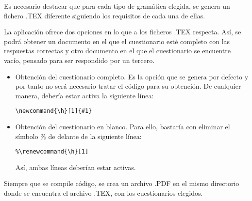 
Es necesario destacar que para cada tipo de gramática elegida, se genera un fichero .TEX diferente siguiendo los requisitos de cada una de ellas. 

La aplicación ofrece dos opciones en lo que a los ficheros .TEX respecta. Así, se podrá obtener un documento en el que el cuestionario esté completo con las respuestas correctas y otro documento en el que el cuestionario se encuentre vacío, pensado para ser respondido por un tercero.

\begin{itemize}
\item Obtención del cuestionario completo. Es la opción que se genera por defecto y por tanto no será necesario tratar el código para su obtención. De cualquier manera, debería estar activa la siguiente línea:
\begin{verbatim}
\newcommand{\h}[1]{#1}
\end{verbatim}
\item Obtención del cuestionario en blanco. Para ello, bastaría con eliminar el símbolo $\%$ de delante de la siguiente línea:

\begin{verbatim}
%\renewcommand{\h}[1]
\end{verbatim}

Así, ambas líneas deberían estar activas.

\end{itemize}

Siempre que se compile código, se crea un archivo .PDF en el mismo directorio donde se encuentra el archivo .TEX, con los cuestionarios elegidos.
